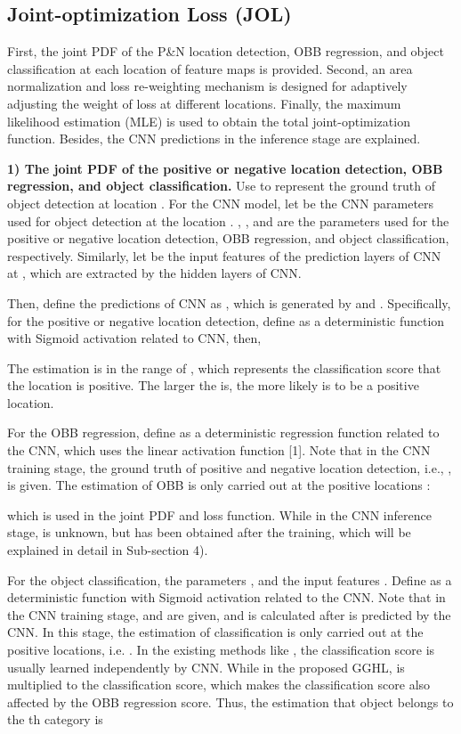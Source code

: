 \vspace{-0.5em}
\subsection{Joint-optimization Loss (JOL)}
First, the joint PDF of the P\&N location detection, OBB regression, and object classification at each location of feature maps is provided. Second, an area normalization and loss re-weighting mechanism is designed for adaptively adjusting the weight of loss at different locations. Finally, the maximum likelihood estimation (MLE) is used to obtain the total joint-optimization function. Besides, the CNN predictions in the inference stage are explained.

\textbf{1) The joint PDF of the positive or negative location detection, OBB regression, and object classification.} Use  to represent the ground truth of object detection at location . For the CNN model, let  be the CNN parameters used for object detection at the location . , , and  are the parameters used for the positive or negative location detection, OBB regression, and object classification, respectively. Similarly, let  be the input features of the prediction layers of CNN at , which are extracted by the hidden layers of CNN. 

Then, define the predictions of CNN as , which is generated by  and . Specifically, for the positive or negative location detection, define  as a deterministic function with Sigmoid activation related to CNN, then,

The estimation  is in the range of , which represents the classification score that the location  is positive. The larger the  is, the more likely  is to be a positive location.

For the OBB regression, define  as a deterministic regression function related to the CNN, which uses the linear activation function [1]. Note that in the CNN training stage, the ground truth of positive and negative location detection, i.e., , is given. The estimation of OBB is only carried out at the positive locations \cite{renFasterRCNNRealTime2017a}:

which is used in the joint PDF and loss function. While in the CNN inference stage,  is unknown, but  has been obtained after the training, which will be explained in detail in Sub-section 4).

For the object classification, the parameters , and the input features . Define  as a deterministic function with Sigmoid activation related to the CNN. Note that in the CNN training stage,  and  are given, and  is calculated after  is predicted by the CNN. In this stage, the estimation of classification is only carried out at the positive locations, i.e.  \cite{redmonYouOnlyLook2016a}. In the existing methods like \cite{redmonYOLOv3IncrementalImprovement2018,linFocalLossDense2017,tian2019fcos,yangSCRDetMoreRobust2019,xu2020gliding}, the classification score is usually learned independently by CNN. While in the proposed GGHL,  is multiplied to the classification score, which makes the classification score also affected by the OBB regression score. Thus, the estimation that object belongs to the th category is


